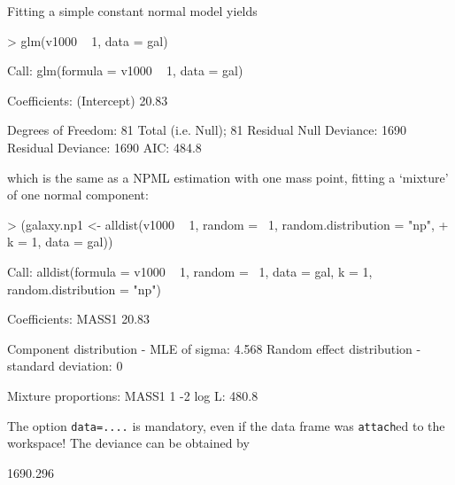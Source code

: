 \documentclass[a4paper]{article}
\begin{document}
\begin{landscape}
Fitting a simple constant normal model yields
\begin{Schunk}
\begin{Sinput}
> glm(v1000 ~ 1, data = gal)
\end{Sinput}
\begin{Soutput}
Call:  glm(formula = v1000 ~ 1, data = gal) 

Coefficients:
(Intercept)  
      20.83  

Degrees of Freedom: 81 Total (i.e. Null);  81 Residual
Null Deviance:	    1690 
Residual Deviance: 1690 	AIC: 484.8 
\end{Soutput}
\end{Schunk}
\noindent which is the same as a NPML estimation with one mass point, fitting a `mixture' of one normal component: 
\begin{Schunk}
\begin{Sinput}
> (galaxy.np1 <- alldist(v1000 ~ 1, random = ~1, random.distribution = "np", 
+     k = 1, data = gal))
\end{Sinput}
\begin{Soutput}
Call:  alldist(formula = v1000 ~ 1, random = ~1, data = gal, k = 1,      random.distribution = "np") 

Coefficients:
MASS1  
20.83  

Component distribution - MLE of sigma:	   4.568 
Random effect distribution - standard deviation:	   0 

Mixture proportions:
MASS1  
    1  
-2 log L:	    480.8 
\end{Soutput}
\end{Schunk}
The option {\tt data=....} is mandatory, even if the data frame was {\tt attach}ed to the workspace!
The deviance can be obtained by 
\begin{Schunk}
\begin{Soutput}
[1] 1690.296
\end{Soutput}
\end{Schunk}


\end{landscape}
\end{document}
